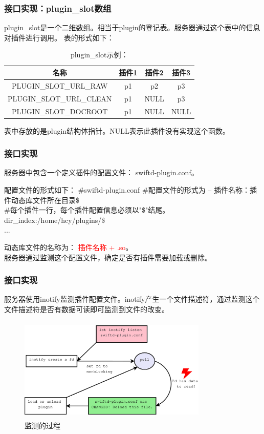 \documentclass[10pt,dvipdfm]{beamer}
\begin{document}
\begin{frame}
	\frametitle{接口实现：plugin\_slot数组}
	plugin\_slot是一个二维数组。相当于plugin的登记表。服务器通过这个表中的信息对插件进行调用。
	表的形式如下：
	\begin{table}[htbp]
	\caption{plugin\_slot示例：}
	\centering
	\begin{tabular}{cccc} %
	\toprule
	\centering 名称 & 插件1 & 插件2 &插件3\\
	\midrule
	\centering PLUGIN\_SLOT\_URL\_RAW & p1 &  p2 & p3\\
	\centering PLUGIN\_SLOT\_URL\_CLEAN &  p1 &  NULL & p3\\
	\centering PLUGIN\_SLOT\_DOCROOT & p1 & NULL & NULL\\
	\bottomrule
	\end{tabular}
	\end{table}
	\begin{block}{}
		表中存放的是plugin结构体指针。NULL表示此插件没有实现这个函数。
	\end{block}
\end{frame}

\begin{frame}
	\frametitle{接口实现}
	服务器中包含一个定义插件的配置文件： swiftd-plugin.conf。
	
	\begin{block}{配置文件的形式如下：}	
		\#swiftd-plugin.conf
		\#配置文件的形式为  -- 插件名称：插件动态库文件所在目录\$\\
		\#每个插件一行，每个插件配置信息必须以"\$"结尾。\\
		dir\_index:/home/hcy/plugins/\$\\
		...
	\end{block}
	
	\pause
	
	\begin{block}{}
	动态库文件的名称为： \textcolor{red}{插件名称 + .so}。\\
	服务器通过监测这个配置文件，确定是否有插件需要加载或删除。
	\end{block}
\end{frame}

\begin{frame}
	\frametitle{接口实现}
	服务器使用inotify监测插件配置文件。inotify产生一个文件描述符，通过监测这个文件描述符是否有数据可读即可监测到文件的改变。
	\begin{figure}[htbp]
	\centering
	\includegraphics[height=5cm, width=9cm]{pics/inotify.eps}
	\caption{监测的过程}
	\end{figure}
\end{frame}
\end{document}
